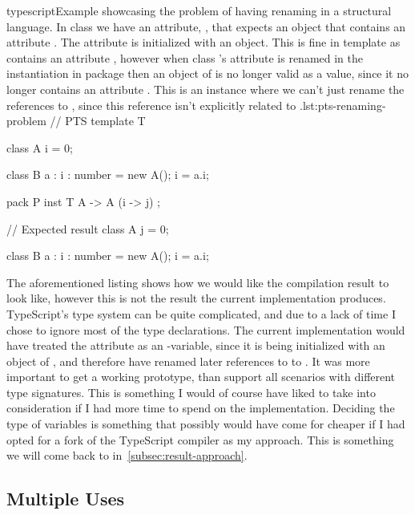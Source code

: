 \begin{code}{typescript}{Example showcasing the problem of having renaming in a structural language. In class  we have an attribute, , that expects an object that contains an attribute . The attribute is initialized with an  object. This is fine in template  as  contains an attribute , however when class 's attribute is renamed in the instantiation in package  then an object of  is no longer valid as a value, since it no longer contains an attribute . This is an instance where we can't just rename the references to , since this reference isn't explicitly related to .}{lst:pts-renaming-problem}
    // PTS
    template T {
        class A {
            i = 0;
        }

        class B {
            a : { i : number } = new A();
            i = a.i;
        }
    }

    pack P {
        inst T { A -> A (i -> j) };
    }

    // Expected result
    class A {
        j = 0;
    }

    class B {
        a : { i : number } = new A();
        i = a.i;
    }
\end{code}

The aforementioned listing shows how we would like the compilation result to look like, however this is not the result the current implementation produces.
TypeScript's type system can be quite complicated, and due to a lack of time I chose to ignore most of the type declarations.
The current implementation would have treated the attribute  as an -variable, since it is being initialized with an object of , and therefore have renamed later references to  to .
It was more important to get a working prototype, than support all scenarios with different type signatures.
This is something I would of course have liked to take into consideration if I had more time to spend on the implementation.
Deciding the type of variables is something that possibly would have come for cheaper if I had opted for a fork of the TypeScript compiler as my approach.
This is something we will come back to in~\vref{subsec:result-approach}.

\subsection{Multiple Uses}\label{subsec:pts-multiple-uses}


